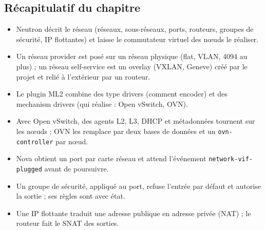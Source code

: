 \subsection{Récapitulatif du chapitre}\label{sec:neu-recap}

\begin{aretenir}
\begin{itemize}
  \item Neutron décrit le réseau (réseaux, sous-réseaux, ports, routeurs, groupes de sécurité, IP flottantes) et
        laisse le commutateur virtuel des nœuds le réaliser.
  \item Un réseau provider est posé sur un réseau physique (flat, VLAN, 4094 au plus) ; un réseau self-service est un
        overlay (VXLAN, Geneve) créé par le projet et relié à l'extérieur par un routeur.
  \item Le plugin ML2 combine des type drivers (comment encoder) et des mechanism drivers (qui réalise : Open vSwitch,
        OVN).
  \item Avec Open vSwitch, des agents L2, L3, DHCP et métadonnées tournent sur les nœuds ; OVN les remplace par deux
        bases de données et un \texttt{ovn-controller} par nœud.
  \item Nova obtient un port par carte réseau et attend l'événement \texttt{network-vif-plugged} avant de poursuivre.
  \item Un groupe de sécurité, appliqué au port, refuse l'entrée par défaut et autorise la sortie ; ses règles sont avec
        état.
  \item Une IP flottante traduit une adresse publique en adresse privée (NAT) ; le routeur fait le SNAT des sorties.
\end{itemize}
\end{aretenir}

